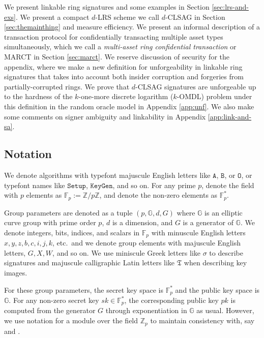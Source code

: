 \documentclass{mrl}
\theoremstyle{plain}
\theoremstyle{definition}
\begin{document}
We present linkable ring signatures and some examples in Section \ref{sec:lrs-and-exs}. We present a compact $d$-LRS scheme we call $d$-CLSAG in Section \ref{sec:themainthing} and measure efficiency. We present an informal description of a transaction protocol for confidentially transacting multiple asset types simultaneously, which we call a \textit{multi-asset ring confidential transaction} or MARCT in Section \ref{sec:marct}. We reserve discussion of security for the appendix, where we make a new definition for unforgeability in linkable ring signatures that takes into account both insider corruption and forgeries from partially-corrupted rings. We prove that $d$-CLSAG signatures are unforgeable up to the hardness of the $k$-one-more discrete logarithm ($k$-OMDL) problem under this definition in the random oracle model in Appendix \ref{app:unf}.  We also make some comments on signer ambiguity and linkability in Appendix \ref{app:link-and-sa}.


\subsection{Notation}\label{sec:notation}
We denote algorithms with typefont majuscule English letters like $\texttt{A}$, $\texttt{B}$, or $\texttt{O}$, or typefont names like $\texttt{Setup}$, $\texttt{KeyGen}$, and so on.  For any prime $p$, denote the field with $p$ elements as $\mathbb{F}_p := \mathbb{Z}/p\mathbb{Z}$, and denote the non-zero elements as $\mathbb{F}_p^*$.

Group parameters are denoted as a tuple $(p, \mathbb{G}, d, G)$ where $\mathbb{G}$ is an elliptic curve group with prime order $p$, $d$ is a dimension, and $G$ is a generator of $\mathbb{G}$. We denote integers, bits, indices, and scalars in $\mathbb{F}_p$ with minuscule English letters $x, y, z, b, c, i, j, k$, etc.\ and we denote group elements with majuscule English letters, $G, X, W$, and so on. We use miniscule Greek letters like $\sigma$ to describe signatures and majuscule calligraphic Latin letters like $\mathfrak{T}$ when describing key images.

For these group parameters, the secret key space is $\mathbb{F}_p^*$ and the public key space is $\mathbb{G}$. For any non-zero secret key $\textit{sk} \in \mathbb{F}_p^*$, the corresponding public key $\textit{pk}$ is computed from the generator $G$ through exponentiation in $\mathbb{G}$ as usual. However, we use notation for a module over the field $\mathbb{Z}_p$ to maintain consistency with, say \cite{van2013cryptonote} and \cite{noether}.
\end{document}
